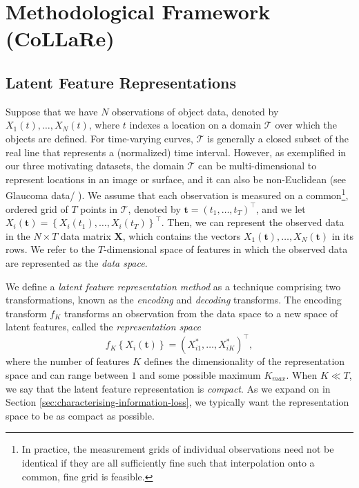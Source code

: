 \section{Methodological Framework (CoLLaRe)}\label{sec:materials-and-methods}

\subsection{Latent Feature Representations}

Suppose that we have $N$ observations of object data, denoted by $X_1 (t), \dots, X_N(t)$, where $t$ indexes a location on a domain $\mathcal{T}$ over which the objects are defined.
For time-varying curves, $\mathcal{T}$ is generally a closed subset of the real line that represents a (normalized) time interval.
However, as exemplified in our three motivating datasets, the domain $\mathcal{T}$ can be multi-dimensional to represent locations in an image or surface, and it can also be non-Euclidean ({see Glaucoma data/ \textcite{lee_bayesian_2019}}).
We assume that each observation is measured on a common\footnote{In practice, the measurement grids of individual observations need not be identical if they are all sufficiently fine such that interpolation onto a common, fine grid is feasible.}, ordered grid of $T$ points in $\mathcal{T}$, denoted by $\mathbf{t} = \left(t_1, \dots, t_T\right)^\top$, and we let $X_i(\mathbf{t}) = \left\{X_i(t_1), \dots, X_i(t_T)\right\}^\top$.
Then, we can represent the observed data in the $N \times T$ data matrix $\mathbf{X}$, which contains the vectors $X_1(\mathbf{t}), \dots, X_N(\mathbf{t})$ in its rows.
We refer to the $T$-dimensional space of features in which the observed data are represented as the \emph{data space}.

We define a \emph{latent feature representation method} as a technique comprising two transformations, known as the \emph{encoding} and \emph{decoding} transforms.
The encoding transform $f_{K}$ transforms an observation from the data space to a new space of latent features, called the \emph{representation space}
$$
f_{K} \left\{X_i(\mathbf{t})\right\} = \left(X_{i1}^*, \dots,  X_{iK}^* \right)^\top,
$$
where the number of features $K$ defines the dimensionality of the representation space and can range between $1$ and some possible maximum $K_{max}$. When $K \ll T$, we say that the latent feature representation is \emph{compact}.
As we expand on in Section \ref{sec:characterising-information-loss}, we typically want the representation space to be as compact as possible.

